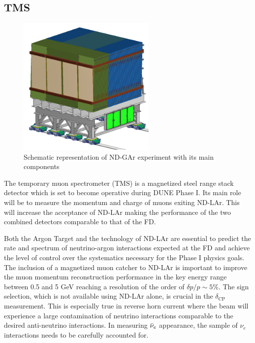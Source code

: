 \subsection{TMS}
\begin{figure}[t]
     \centering
     \includegraphics[width=0.6\textwidth]{figures/ch3-DUNE/TMS.png}
     \caption{Schematic representation of ND-GAr experiment with its main components}
        \label{fig:TMS}
\end{figure}
The temporary muon spectrometer (TMS) is a magnetized steel range stack detector which is set to become operative during DUNE Phase I. Its main role will be to measure the momentum and charge of muons exiting ND-LAr. This will increase the acceptance of ND-LAr making the performance of the two combined detectors comparable to that of the FD.

Both the Argon Target and the technology of ND-LAr are essential to predict the rate and spectrum of neutrino-argon interactions expected at the FD and achieve the level of control over the systematics necessary for the Phase I physics goals. The inclusion of a magnetized muon catcher to ND-LAr is important to improve the muon momentum reconstruction performance in the key energy range between 0.5 and 5 GeV reaching a resolution of the order of $\delta p / p \sim 5\%$. The sign selection, which is not available using ND-LAr alone, is crucial in the $\delta_\textrm{CP}$ measurement. This is especially true in reverse horn current where the beam will experience a large contamination of neutrino interactions comparable to the desired anti-neutrino interactions. In measuring $\Bar{\nu}_e$ appearance, the sample of $\nu_e$ interactions needs to be carefully accounted for.

